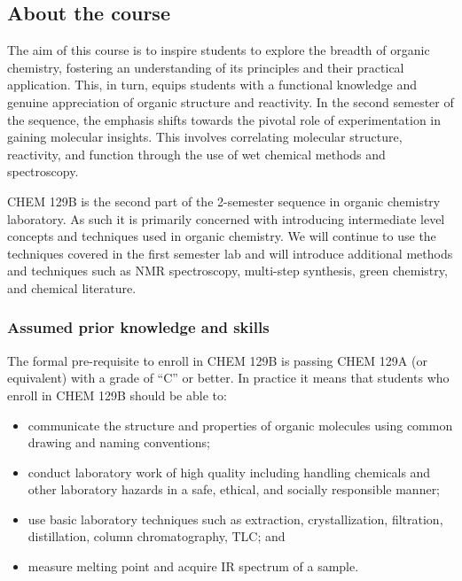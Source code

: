 \subsection{About the course}\label{about-the-course}

The aim of this course is to inspire students to explore the breadth of
organic chemistry, fostering an understanding of its principles and
their practical application. This, in turn, equips students with a
functional knowledge and genuine appreciation of organic structure and
reactivity. In the second semester of the sequence, the emphasis shifts
towards the pivotal role of experimentation in gaining molecular
insights. This involves correlating molecular structure, reactivity, and
function through the use of wet chemical methods and spectroscopy.

CHEM 129B is the second part of the 2-semester sequence in organic
chemistry laboratory. As such it is primarily concerned with introducing
intermediate level concepts and techniques used in organic chemistry. We
will continue to use the techniques covered in the first semester lab
and will introduce additional methods and techniques such as NMR
spectroscopy, multi-step synthesis, green chemistry, and chemical
literature.

\subsubsection{Assumed prior knowledge and
skills}\label{assumed-prior-knowledge-and-skills}

The formal pre-requisite to enroll in CHEM 129B is passing CHEM 129A (or
equivalent) with a grade of ``C'' or better. In practice it means that
students who enroll in CHEM 129B should be able to:

\begin{itemize}
\tightlist
\item
  communicate the structure and properties of organic molecules using
  common drawing and naming conventions;
\item
  conduct laboratory work of high quality including handling chemicals
  and other laboratory hazards in a safe, ethical, and socially
  responsible manner;
\item
  use basic laboratory techniques such as extraction, crystallization,
  filtration, distillation, column chromatography, TLC; and
\item
  measure melting point and acquire IR spectrum of a sample.
\end{itemize}


